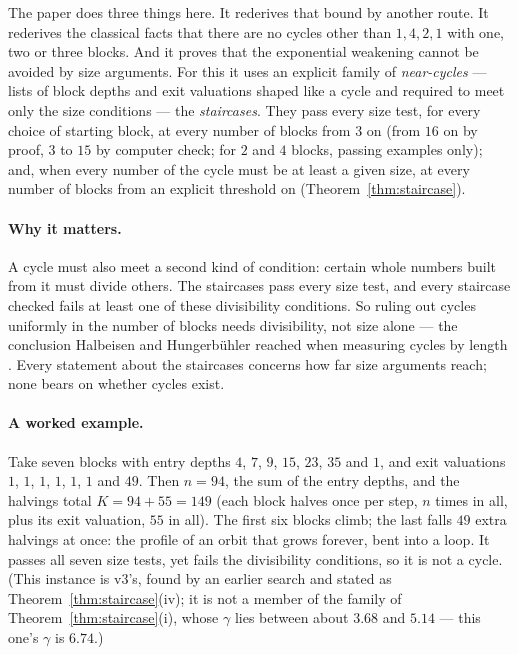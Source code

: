 \documentclass[11pt]{article}
\theoremstyle{remark}
\begin{document}
The paper does three things here. It rederives that bound by another route. It rederives the classical facts that there are no cycles other than $1, 4, 2, 1$ with one, two or three blocks. And it proves that the exponential weakening cannot be avoided by size arguments. For this it uses an explicit family of \emph{near-cycles} --- lists of block depths and exit valuations shaped like a cycle and required to meet only the size conditions --- the \emph{staircases}. They pass every size test, for every choice of starting block, at every number of blocks from $3$ on (from $16$ on by proof, $3$ to $15$ by computer check; for $2$ and $4$ blocks, passing examples only); and, when every number of the cycle must be at least a given size, at every number of blocks from an explicit threshold on (Theorem~\ref{thm:staircase}).

\paragraph{Why it matters.} A cycle must also meet a second kind of condition: certain whole numbers built from it must divide others. The staircases pass every size test, and every staircase checked fails at least one of these divisibility conditions. So ruling out cycles uniformly in the number of blocks needs divisibility, not size alone --- the conclusion Halbeisen and Hungerb\"uhler reached when measuring cycles by length \cite{hh}. Every statement about the staircases concerns how far size arguments reach; none bears on whether cycles exist.

\paragraph{A worked example.} Take seven blocks with entry depths $4$, $7$, $9$, $15$, $23$, $35$ and $1$, and exit valuations $1$, $1$, $1$, $1$, $1$, $1$ and $49$. Then $n = 94$, the sum of the entry depths, and the halvings total $K = 94 + 55 = 149$ (each block halves once per step, $n$ times in all, plus its exit valuation, $55$ in all). The first six blocks climb; the last falls $49$ extra halvings at once: the profile of an orbit that grows forever, bent into a loop. It passes all seven size tests, yet fails the divisibility conditions, so it is not a cycle. (This instance is v3's, found by an earlier search and stated as Theorem~\ref{thm:staircase}(iv); it is not a member of the family of Theorem~\ref{thm:staircase}(i), whose $\gamma$ lies between about $3.68$ and $5.14$ --- this one's $\gamma$ is $6.74$.)
\end{document}
